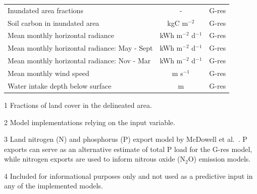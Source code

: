 \documentclass[review, authoryear, 1p]{elsarticle} %
\begin{document}
\begin{table}[ht]
\begin{threeparttable}
{\begin{tabular*}{\linewidth}{@{\extracolsep{\fill}}lcc@{}}
    Inundated area fractions\tnote{1}&-& G-res\\%
    Soil carbon in inundated area&kgC m$^{-2}$& G-res\\%
    Mean monthly horizontal radiance&kWh m$^{-2}$ d$^{-1}$& G-res\\%
    Mean monthly horizontal radiance: May {-} Sept&kWh m$^{-2}$ d$^{-1}$& G-res\\%
    Mean monthly horizontal radiance: Nov {-} Mar&kWh m$^{-2}$ d$^{-1}$& G-res\\%
    Mean monthly wind speed&m s$^{-1}$& G-res\\%
    Water intake depth below surface&m& G-res\\
    \bottomrule
    \end{tabular*}
    }
    {\noindent
    \begin{tablenotes}
        \footnotesize
        \item{1} Fractions of land cover in the delineated area.
        \item{2} Model implementations relying on the input variable.
        \item{3} Land nitrogen (N) and phosphorus (P) export model by McDowell et al.~\cite{McDowell2020}. P exports can serve as an alternative estimate of total P load for the G-res model, while nitrogen exports are used to inform nitrous oxide (N$_2$O) emission models.
        \item{4} Included for informational purposes only and not used as a predictive input in any of the implemented models.
    \end{tablenotes}
    }
\end{threeparttable}
\end{table}

\end{document}
